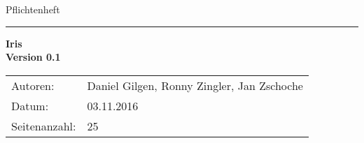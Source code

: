 \begin{titlepage}
$\,$
\vspace{4cm}\\
\LARGE{Pflichtenheft}
\hrule
\vspace{2cm}

\huge{\textbf{Iris}}\\[1cm]
\Large{\textbf{Version 0.1}}

\vfill
\large
\begin{tabular}{|ll|}
\hline
Autoren: & Daniel Gilgen, Ronny Zingler, Jan Zschoche\\
Datum: & 03.11.2016 \\
Seitenanzahl: & 25\\
\hline
\end{tabular}
\end{titlepage}
